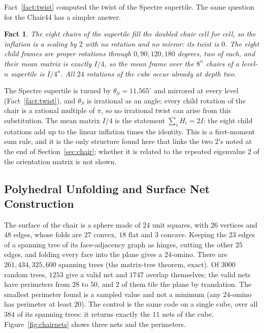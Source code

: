 \documentclass[11pt]{article}
\newtheorem{fact}{Fact}
\theoremstyle{definition}
\theoremstyle{remark}
\begin{document}
Fact~\ref{fact:twist} computed the twist of the Spectre supertile.  The same question for the
Chair44 has a simpler answer.

\begin{fact}
\label{fact:chairtwist}
The eight chairs of the supertile fill the doubled chair cell for cell, so the inflation is a
scaling by $2$ with no rotation and no mirror: its twist is $0$.  The eight child frames are
proper rotations through $0, 90, 120, 180$ degrees, two of each, and their mean matrix is exactly
$I/4$, so the mean frame over the $8^{n}$ chairs of a level-$n$ supertile is $I/4^{n}$.  All
$24$ rotations of the cube occur already at depth two.
\end{fact}

\noindent
The Spectre supertile is turned by $\theta_{S}=11.565^{\circ}$ and mirrored at every level
(Fact~\ref{fact:twist}), and $\theta_{S}$ is irrational as an angle; every child rotation of the
chair is a rational multiple of $\pi$, so no irrational twist can arise from this substitution.  The mean
matrix $I/4$ is the statement $\sum_{i}H_{i}=2I$: the eight child rotations add up to the linear
inflation times the identity.  This is a first-moment sum rule, and it is the only structure found
here that links the two $2$'s noted at the end of Section~\ref{sec:chair}; whether it is related to
the repeated eigenvalue $2$ of the orientation matrix is not shown.

\subsection{Polyhedral Unfolding and Surface Net Construction}

The surface of the chair is a sphere made of $24$ unit squares, with $26$ vertices and
$48$ edges, whose folds are $27$ convex, $18$ flat and $3$ concave.  Keeping the $23$
edges of a spanning tree of its face-adjacency graph as hinges, cutting the other $25$ edges, and folding every face into
the plane gives a $24$-omino.  There are $261{,}434{,}325{,}600$ spanning trees (the matrix-tree theorem, exact).  Of $3000$
random trees, $1253$ give a valid net and $1747$ overlap themselves; the valid nets have
perimeters from $28$ to $50$, and $2$ of them tile the plane by translation.  The smallest
perimeter found is a sampled value and not a minimum (any $24$-omino has perimeter at least $20$).  The
control is the same code on a single cube, over all $384$ of its spanning trees: it returns exactly the
$11$ nets of the cube.  Figure~\ref{fig:chairnets} shows three nets and the perimeters.
\end{document}
